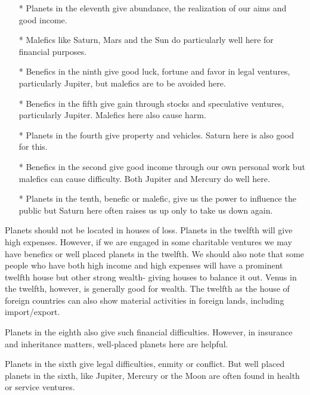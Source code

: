 \begin{enumerate}
\item[*] Planets in the eleventh give abundance, the realization of our aims and good income.

\item[*] Malefics like Saturn, Mars and the Sun do particularly well here for financial purposes.

\item[*] Benefics in the ninth give good luck, fortune and favor in legal ventures, particularly Jupiter, but malefics are to be avoided here.

\item[*] Benefics in the fifth give gain through stocks and speculative ventures, particularly Jupiter. Malefics here also cause harm.

\item[*] Planets in the fourth give property and vehicles. Saturn here is also good for this.

\item[*] Benefics in the second give good income through our own personal work but malefics can cause difficulty. Both Jupiter and Mercury do well here.

\item[*] Planets in the tenth, benefic or malefic, give us the power to influence the public but Saturn here often raises us up only to take us down again. 
 \end{enumerate}
 

Planets should not be located in houses of loss. Planets in the twelfth will give high expenses. However, if we are engaged in some charitable ventures we may have benefics or well placed planets in the twelfth. We should also note that some people who have both high income and high expenses will have a prominent twelfth house but other strong wealth- giving houses to balance it out. Venus in the twelfth, however, is generally good for wealth. The twelfth as the house of foreign countries can also show material activities in foreign lands, including import/export.

Planets in the eighth also give such financial difficulties. However, in insurance and inheritance matters, well-placed planets here are helpful.

Planets in the sixth give legal difficulties, enmity or conflict.  But well placed planets in the sixth, like Jupiter, Mercury or the Moon are often found in health or service ventures.

 

